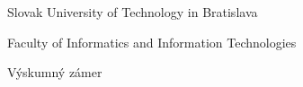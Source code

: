 \begin{center}
\thispagestyle{empty}
{\Large Slovak University of Technology in Bratislava}
\par\end{center}{\Large \par}

\begin{center}
{\Large Faculty of Informatics and Information Technologies}
\par\end{center}{\Large \par}

\smallskip{}

\begin{center}
\myEvidenceNumber
\par\end{center}
\vfill{}

\begin{center}
\textbf{\Large \myName}
\par\end{center}{\Large \par}

\medskip{}


\begin{center}
\textbf{\LARGE \myTitle }
\par\end{center}{\huge \par}

\medskip{}


\begin{center}

{\Large Výskumný zámer}
\par\end{center}{\Large \par}

\vfill{}
